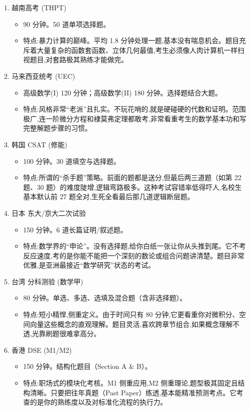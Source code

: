 \begin{enumerate}
\begin{itemize}
新高考Ⅱ卷：海南、辽宁、重庆
    \item 特点:现在的趋势是“反套路”。虽然大纲没变,但解析几何和导数的计算量大得惊人,压轴题越来越像数学竞赛初赛。这不仅考脑力,更是在压榨考生的极限算力和在繁琐步骤中不出错的稳定性。
\end{itemize}
\item 越南高考 (THPT) 
\begin{itemize}
    \item 90 分钟。50 道单项选择题。
    \item 特点:暴力计算的巅峰。平均 1.8 分钟处理一题,基本没有喘息机会。题目充斥着大量复杂的函数套函数、立体几何最值,考生必须像人肉计算机一样扫视题目,对套路极其熟练才能做完。
\end{itemize}
\item 马来西亚统考 (UEC) 
\begin{itemize}
    \item 高级数学(I) 120 分钟；高级数学(II) 180 分钟。选择题结合大题。
    \item 特点:风格非常“老派”且扎实。不玩花哨的,就是硬碰硬的代数和证明。范围极广,连一阶微分方程和棣莫弗定理都敢考,非常看重考生的数学基本功和写完整解题步骤的习惯。
\end{itemize}
\item 韩国 CSAT (修能) 
\begin{itemize}
    \item 100 分钟。30 道填空与选择题。
    \item 特点:所谓的“杀手题”策略。前面的题都是送分,但最后两三道题（如第 22 题、30 题）的难度陡增,逻辑弯路极多。这种考试容错率低得吓人,名校生基本默认前 27 题全对,生死全看最后那几道逻辑断层题。
\end{itemize}
\item 日本 东大/京大二次试验 
\begin{itemize}
    \item 150 分钟。6 道长篇证明/叙述题。
    \item 特点:数学界的“申论”。没有选择题,给你白纸一张让你从头推到尾。它不考反应速度,考的是你能不能把一个深刻的数论或组合问题讲清楚。题目非常优雅,是亚洲最接近“数学研究”状态的考试。
\end{itemize}
\item 台湾 分科测验 (数学甲) 
\begin{itemize}
    \item 80 分钟。单选、多选、选填及混合题（含非选择题）。
    \item 特点:短小精悍,侧重定义。由于时间只有 80 分钟,它更看重你对微积分、空间向量这些概念的直观理解。题目灵活,喜欢跨章节组合,如果概念理解不透,光靠刷题很难拿高分。
\end{itemize}
\item 香港 DSE (M1/M2) 
\begin{itemize}
    \item 150 分钟。结构化题目（Section A \& B）。
    \item 特点:职场式的模块化考核。M1 侧重应用,M2 侧重理论,题型极其固定且结构清晰。只要把往年真题（Past Paper）练透,基本能精准预测考点。它考查的是你的熟练度以及对标准化流程的执行力。
\end{itemize}
\end{enumerate}
